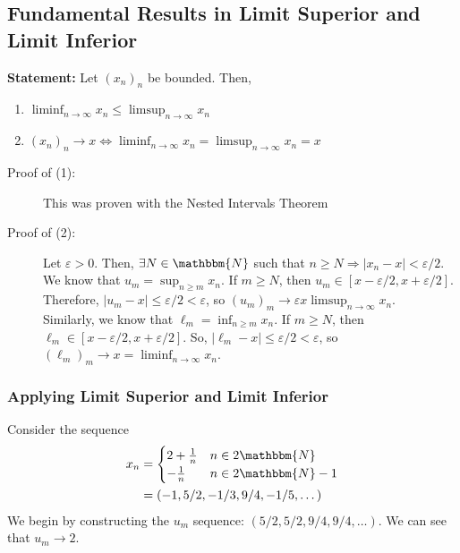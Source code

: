 \documentclass[10pt]{extarticle}
\newcommand{\N}{\mathbbm{N}}
\begin{document}
    \subsection{Fundamental Results in Limit Superior and Limit Inferior}%
    \textbf{Statement:} Let $(x_n)_n$ be bounded. Then,
    \begin{enumerate}[(1)]
      \item $\displaystyle \liminf_{n\rightarrow\infty} x_n \leq \limsup_{n\rightarrow\infty} x_n$
      \item $\displaystyle (x_n)_n\rightarrow x \Leftrightarrow \liminf_{n\rightarrow\infty}x_n = \limsup_{n\rightarrow\infty}x_n = x$
    \end{enumerate}
    \begin{description}
      \item[Proof of (1):] This was proven with the Nested Intervals Theorem
      \item[Proof of (2):] Let $\varepsilon > 0$. Then, $\exists N \in\N$ such that $n\geq N \Rightarrow |x_n - x| < \varepsilon/2$.\\

        We know that $u_m = \sup_{n\geq m}x_n$. If $m\geq N$, then $u_m \in [x-\varepsilon/2,x+\varepsilon/2]$. Therefore, $|u_m-x| \leq \varepsilon/2 < \varepsilon$, so $(u_m)_m \rightarrow \varepsilon x \limsup_{n\rightarrow\infty}x_n$.\\

        Similarly, we know that $\ell_m = \inf_{n\geq m}x_n$. If $m\geq N$, then $\ell_m \in [x-\varepsilon/2,x+\varepsilon/2]$. So, $|\ell_m - x| \leq \varepsilon/2 < \varepsilon$, so $(\ell_m)_m \rightarrow x = \liminf_{n\rightarrow\infty}x_n$.
    \end{description}
    \subsubsection{Applying Limit Superior and Limit Inferior}%
    Consider the sequence
    \begin{align*}
      x_n &= \begin{cases}
        2 + \frac{1}{n}&n\in2\N\\
        -\frac{1}{n}&n\in2\N-1
      \end{cases}\\
          &= (-1,5/2,-1/3,9/4,-1/5,\dots)
    \end{align*}
    We begin by constructing the $u_m$ sequence: $(5/2,5/2,9/4,9/4,\dots)$. We can see that $u_m \rightarrow 2$.\\
\end{document}
